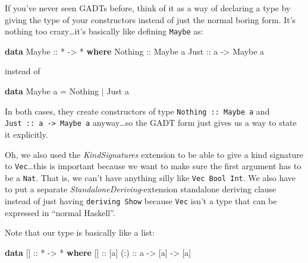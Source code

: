 \documentclass[]{article}
\newenvironment{Shaded}{}{}
\newcommand{\DataTypeTok}[1]{\textcolor[rgb]{0.56,0.13,0.00}{#1}}
\newcommand{\FunctionTok}[1]{\textcolor[rgb]{0.02,0.16,0.49}{#1}}
\newcommand{\KeywordTok}[1]{\textcolor[rgb]{0.00,0.44,0.13}{\textbf{#1}}}
\newcommand{\NormalTok}[1]{#1}
\newcommand{\OtherTok}[1]{\textcolor[rgb]{0.00,0.44,0.13}{#1}}
\begin{document}
If you've never seen GADTs before, think of it as a way of declaring a type by
giving the type of your constructors instead of just the normal boring form.
It's nothing too crazy\ldots{}it's basically like defining \texttt{Maybe} as:

\begin{Shaded}
\begin{Highlighting}[]
\KeywordTok{data} \DataTypeTok{Maybe}\OtherTok{ ::} \FunctionTok{*} \OtherTok{->} \FunctionTok{*} \KeywordTok{where}
    \DataTypeTok{Nothing}\OtherTok{ ::} \DataTypeTok{Maybe}\NormalTok{ a}
    \DataTypeTok{Just}\OtherTok{    ::}\NormalTok{ a }\OtherTok{->} \DataTypeTok{Maybe}\NormalTok{ a}
\end{Highlighting}
\end{Shaded}

instead of

\begin{Shaded}
\begin{Highlighting}[]
\KeywordTok{data} \DataTypeTok{Maybe}\NormalTok{ a }\FunctionTok{=} \DataTypeTok{Nothing} \FunctionTok{|} \DataTypeTok{Just}\NormalTok{ a}
\end{Highlighting}
\end{Shaded}

In both cases, they create constructors of type \texttt{Nothing\ ::\ Maybe\ a}
and \texttt{Just\ ::\ a\ -\textgreater{}\ Maybe\ a} anyway\ldots{}so the GADT
form just gives us a way to state it explicitly.

Oh, we also used the \emph{KindSignatures} extension to be able to give a kind
signature to \texttt{Vec}\ldots{}this is important because we want to make sure
the first argument has to be a \texttt{Nat}. That is, we can't have anything
silly like \texttt{Vec\ Bool\ Int}. We also have to put a separate
\emph{StandaloneDeriving}-extension standalone deriving clause instead of just
having \texttt{deriving\ Show} because \texttt{Vec} isn't a type that can be
expressed in ``normal Haskell''.

Note that our type is basically like a list:

\begin{Shaded}
\begin{Highlighting}[]
\KeywordTok{data}\NormalTok{ []}\OtherTok{ ::} \FunctionTok{*} \OtherTok{->} \FunctionTok{*} \KeywordTok{where}
\NormalTok{    []}\OtherTok{  ::}\NormalTok{ [a]}
\OtherTok{    (:) ::}\NormalTok{ a }\OtherTok{->}\NormalTok{ [a] }\OtherTok{->}\NormalTok{ [a]}
\end{Highlighting}
\end{Shaded}
\end{document}
